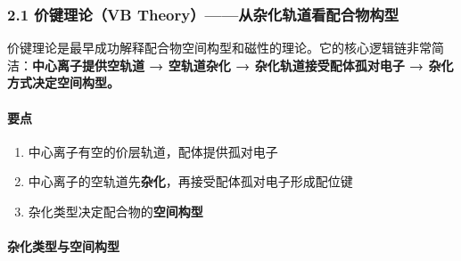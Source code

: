 \documentclass[a4paper,11pt]{ctexart}
\providecommand{\tightlist}{\setlength{\itemsep}{0pt}\setlength{\parskip}{0pt}}
\begin{document}
\subsubsection{2.1 价键理论（VB Theory）------从杂化轨道看配合物构型}\label{ux4ef7ux952eux7406ux8bbavb-theoryux4eceux6742ux5316ux8f68ux9053ux770bux914dux5408ux7269ux6784ux578b}

价键理论是最早成功解释配合物空间构型和磁性的理论。它的核心逻辑链非常简洁：\textbf{中心离子提供空轨道 → 空轨道杂化 → 杂化轨道接受配体孤对电子 → 杂化方式决定空间构型。}

\paragraph{要点}\label{ux8981ux70b9}

\begin{enumerate}
\def\labelenumi{\arabic{enumi}.}
\tightlist
\item
  中心离子有空的价层轨道，配体提供孤对电子
\item
  中心离子的空轨道先\textbf{杂化}，再接受配体孤对电子形成配位键
\item
  杂化类型决定配合物的\textbf{空间构型}
\end{enumerate}

\paragraph{杂化类型与空间构型}\label{ux6742ux5316ux7c7bux578bux4e0eux7a7aux95f4ux6784ux578b}
\end{document}
